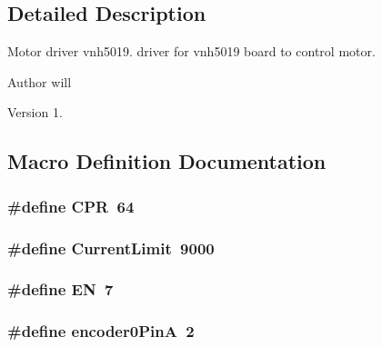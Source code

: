 \subsection{Detailed Description}
Motor driver vnh5019. driver for vnh5019 board to control motor. \begin{DoxyAuthor}{Author}
will 
\end{DoxyAuthor}
\begin{DoxyVersion}{Version}
1. 
\end{DoxyVersion}


\subsection{Macro Definition Documentation}
\hypertarget{vnh5019__base_8ino_ad8f1771d4051eafad228df4d397d7e47}{
\subsubsection[{C\-P\-R}]{\setlength{\rightskip}{0pt plus 5cm}\#define C\-P\-R~64}}\label{vnh5019__base_8ino_ad8f1771d4051eafad228df4d397d7e47}
\hypertarget{vnh5019__base_8ino_ae8de9852663b6b1e4218c93e2a8174a0}{
\subsubsection[{Current\-Limit}]{\setlength{\rightskip}{0pt plus 5cm}\#define Current\-Limit~9000}}\label{vnh5019__base_8ino_ae8de9852663b6b1e4218c93e2a8174a0}
\hypertarget{vnh5019__base_8ino_a22e6626f2c98ed902f8ded47f6438c05}{
\subsubsection[{E\-N}]{\setlength{\rightskip}{0pt plus 5cm}\#define E\-N~7}}\label{vnh5019__base_8ino_a22e6626f2c98ed902f8ded47f6438c05}
\hypertarget{vnh5019__base_8ino_ae821026f68673a780d177a5df02233ac}{
\subsubsection[{encoder0\-Pin\-A}]{\setlength{\rightskip}{0pt plus 5cm}\#define encoder0\-Pin\-A~2}}\label{vnh5019__base_8ino_ae821026f68673a780d177a5df02233ac}

